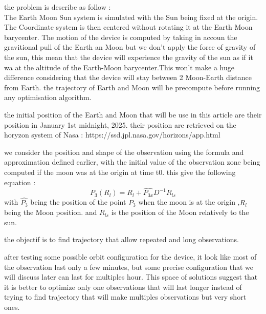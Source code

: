 \documentclass{article} %
\begin{document}
		the problem is describe as follow :
		\\
		The Earth Moon Sun system is simulated with the Sun being fixed at the origin. The Coordinate system is then centered without rotating it at the Earth Moon barycenter. The motion of the device is computed by taking in accoun the gravitional pull of the Earth an Moon but we don't apply the force of gravity of the sun, this mean that the device will experience the gravity of the sun as if it wa at the altitude of the Earth-Moon barycenter.This won't make a huge difference considering that the device will stay between 2 Moon-Earth distance from Earth. the trajectory of Earth and Moon will be precompute before running any optimisation algorithm.
		
		the initial position of the Earth and Moon that will be use in this article are their position in January 1st midnight, 2025. their position are retrieved on the horyzon system of Nasa : https://ssd.jpl.nasa.gov/horizons/app.html
		
		
		
		we consider the position and shape of the observation using the formula and approximation defined earlier, with the initial value of the observation zone being computed if the moon was at the origin at time t0.
		this give the following equation :
		$$
		P_3(R_l)=R_{l}+\hat{P_{3x}}D^{-1}R_{ls}
		$$
		with $\hat{P_3}$ being the position of the point $P_3$ when the moon is at the origin
		,$R_{l}$ being the Moon position.
		and $R_{ls}$ is the position of the Moon relatively to the sun.
		
		the objectif is to find trajectory that allow repeated and long observations.
		
		
		after testing some possible orbit configuration for the device, it look like most of the observation last only a few minutes, but some precise configuration that we will discuss later can last for multiples hour. This space of solutions suggest that it is better to optimize only one observations that will last longer instead of trying to find trajectory that will make multiples observations but very short ones.
		
\end{document}
